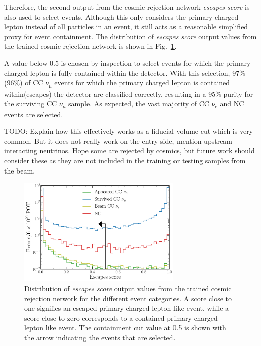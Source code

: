 Therefore, the second output from the cosmic rejection network \emph{escapes score} is also used
to select events. Although this only considers the primary charged lepton instead of all particles
in an event, it still acts as a reasonable simplified proxy for event containment. The
distribution of \emph{escapes score} output values from the trained cosmic rejection network is
shown in Fig.~\ref{fig:final_escapes_outputs}.

A value below 0.5 is chosen by inspection to select events for which the primary charged lepton is
fully contained within the detector. With this selection, 97\%(96\%) of CC $\nu_{\mu}$ events for
which the primary charged lepton is contained within(escapes) the detector are classified
correctly, resulting in a 95\% purity for the surviving CC $\nu_{\mu}$ sample. As expected, the
vast majority of CC $\nu_{e}$ and NC events are selected.

TODO: Explain how this effectively works as a fiducial volume cut which is very common. But it
does not really work on the entry side, mention upstream interacting neutrinos. Hope some are
rejected by cosmics, but future work should consider these as they are not included in the
training or testing samples from the beam.

\begin{figure} %
    \includegraphics[width=0.7\textwidth]{diagrams/6-cvn/chipsnet/final_escapes_outputs.pdf}
    \caption[Distribution of escapes score output values.]
    {Distribution of \emph{escapes score} output values from the trained cosmic rejection network
        for the different event categories. A score close to one signifies an escaped primary
        charged lepton like event, while a score close to zero corresponds to a contained primary
        charged lepton like event. The containment cut value at 0.5 is shown with the arrow
        indicating the events that are selected.}
    \label{fig:final_escapes_outputs}
\end{figure}

